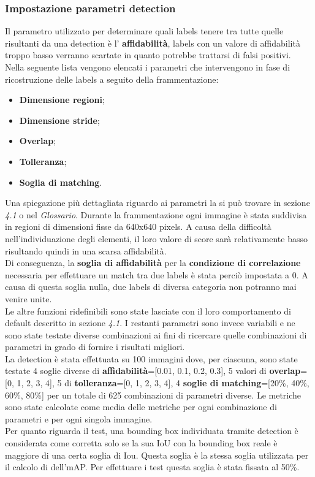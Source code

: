 \subsubsection{Impostazione parametri detection}
Il parametro utilizzato per determinare quali labels tenere tra tutte quelle risultanti da una detection è l' \textbf{affidabilità}, labels con un valore di affidabilità troppo basso verranno scartate in quanto potrebbe trattarsi di falsi positivi.\\
Nella seguente lista vengono elencati i parametri che intervengono in fase di ricostruzione delle labels a seguito della frammentazione:
\begin{itemize}
\item \textbf{Dimensione regioni};
\item \textbf{Dimensione stride};
\item \textbf{Overlap};
\item \textbf{Tolleranza};
\item \textbf{Soglia di matching}.
\end{itemize}
Una spiegazione più dettagliata riguardo ai parametri la si può trovare in sezione \textit{4.1} o nel \textit{Glossario}.
Durante la frammentazione ogni immagine è stata suddivisa in regioni di dimensioni fisse da 640x640 pixels. A causa della difficoltà nell'individuazione degli elementi, il loro valore di score sarà relativamente basso risultando quindi in una scarsa affidabilità.\\
Di conseguenza, la \textbf{soglia di affidabilità} per la \textbf{condizione di correlazione} necessaria per effettuare un match tra due labels è stata perciò impostata a 0. A causa di questa soglia nulla, due labels di diversa categoria non potranno mai venire unite.\\
Le altre funzioni ridefinibili sono state lasciate con il loro comportamento di default descritto in sezione \textit{4.1}. I restanti parametri sono invece variabili e ne sono state testate diverse combinazioni ai fini di ricercare quelle combinazioni di parametri in grado di fornire i risultati migliori.\\
La detection è stata effettuata su 100 immagini dove, per ciascuna, sono state testate 4 soglie diverse di \textbf{affidabilità}=[0.01, 0.1, 0.2, 0.3], 5 valori di \textbf{overlap}=[0, 1, 2, 3, 4], 5 di \textbf{tolleranza}=[0, 1, 2, 3, 4], 4 \textbf{soglie di matching}=[20\%, 40\%, 60\%, 80\%] per un totale di 625 combinazioni di parametri diverse. Le metriche sono state calcolate come media delle metriche per ogni combinazione di parametri e per ogni singola immagine.\\
Per quanto riguarda il test, una bounding box individuata tramite detection è considerata come corretta solo se la sua IoU con la bounding box reale è maggiore di una certa soglia di Iou. Questa soglia è la stessa soglia utilizzata per il calcolo di dell'mAP. Per effettuare i test questa soglia è stata fissata al 50\%.

